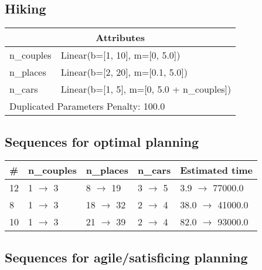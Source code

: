 \documentclass{article}
\begin{document}
                            \newpage \subsection{Hiking}
                    \begin{center}
                    \begin{tabular}{@{}p{}p{}@{}}
                    \multicolumn{2}{c}{\bf \large Attributes}\\\midrule
                    n\_couples & Linear(b=[1, 10], m=[0, 5.0])\\
n\_places & Linear(b=[2, 20], m=[0.1, 5.0])\\
n\_cars & Linear(b=[1, 5], m=[0, 5.0 + n\_couples]) \\\midrule
                    \multicolumn{2}{l}{Duplicated Parameters Penalty: 100.0}
                    \end{tabular}
                    \end{center}
                
                            \subsection*{Sequences for optimal planning}

                            \begin{center}
                            \begin{tabular}{@{}l|l|l|l|l@{}}
                            \# & n\_couples & n\_places & n\_cars & Estimated time\\\midrule
                            12&1 $\rightarrow$ 3&8 $\rightarrow$ 19&3 $\rightarrow$ 5&3.9 $\rightarrow$ 77000.0\\
8&1 $\rightarrow$ 3&18 $\rightarrow$ 32&2 $\rightarrow$ 4&38.0 $\rightarrow$ 41000.0\\
10&1 $\rightarrow$ 3&21 $\rightarrow$ 39&2 $\rightarrow$ 4&82.0 $\rightarrow$ 93000.0
                            \end{tabular}
                            \end{center}
                    
                         \subsection*{Sequences for agile/satisficing planning}
\end{document}
